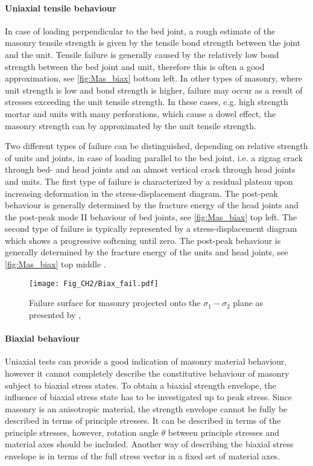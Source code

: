 \paragraph{Uniaxial tensile behaviour}
In case of loading perpendicular to the bed joint, a rough estimate of the masonry tensile strength is given by the tensile bond strength between the joint and the unit. Tensile failure is generally caused by the relatively low bond strength between the bed joint and unit, therefore this is often a good approximation, see \autoref{fig:Mas_biax} bottom left. 
In other types of masonry, where unit strength is low and bond strength is higher, failure may occur as a result of stresses exceeding the unit tensile strength. In these cases, e.g. high strength mortar and units with many perforations, which cause a dowel effect, the masonry strength can by approximated by the unit tensile strength.

Two different types of failure can be distinguished, depending on relative strength of units and joints, in case of loading parallel to the bed joint, i.e. a zigzag crack through bed- and head joints and an almost vertical crack through head joints and units. The first type of failure is characterized by a residual plateau upon increasing deformation in the stress-displacement diagram. The post-peak behaviour is generally determined by the fracture energy of the head joints and the post-peak mode II behaviour of bed joints, see \autoref{fig:Mas_biax} top left. The second type of failure is typically represented by a stress-displacement diagram which shows a progressive softening until zero. The post-peak behaviour is generally determined by the fracture energy of the units and head joints, see \autoref{fig:Mas_biax} top middle \cite{lourenco1996}.

\begin{figure}[!htb]
    \centering
    \texttt{[image: Fig\_CH2/Biax\_fail.pdf]}
    \caption{Failure surface for masonry projected onto the $\sigma_{1}-\sigma_{2}$ plane as presented by \citet{Mersch2015}, \cite{page1981}}
    \label{fig:Biax_fail}
\end{figure}

\paragraph{Biaxial behaviour}
Uniaxial tests can provide a good indication of masonry material behaviour, however it cannot completely describe the constitutive behaviour of masonry subject to biaxial stress states. To obtain a biaxial strength envelope, the influence of biaxial stress state has to be investigated up to peak stress. Since masonry is an anisotropic material, the strength envelope cannot be fully be described in terms of principle stresses. It can be described in terms of the principle stresses, however, rotation angle $\theta$ between principle stresses and material axes should be included. Another way of describing the biaxial stress envelope is in terms of the full stress vector in a fixed set of material axes.


